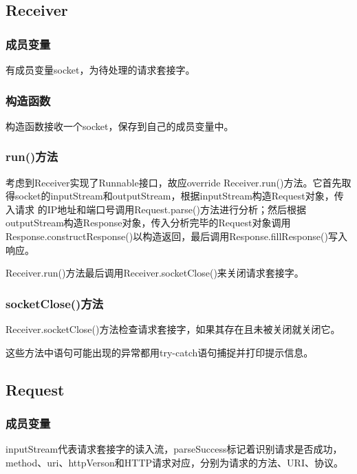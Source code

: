\documentclass[UTF8,12pt]{ctexart}
\begin{document}
\subsection{Receiver}

\subsubsection{成员变量}

有成员变量socket，为待处理的请求套接字。

\subsubsection{构造函数}

构造函数接收一个socket，保存到自己的成员变量中。

\subsubsection{run()方法}

考虑到Receiver实现了Runnable接口，故应override Receiver.run()方法。它首先取得socket的inputStream和outputStream，根据inputStream构造Request对象，传入请求 的IP地址和端口号调用Request.parse()方法进行分析；然后根据outputStream构造Response对象，传入分析完毕的Request对象调用Response.constructResponse()以构造返回，最后调用Response.fillResponse()写入响应。

Receiver.run()方法最后调用Receiver.socketClose()来关闭请求套接字。

\subsubsection{socketClose()方法}

Receiver.socketClose()方法检查请求套接字，如果其存在且未被关闭就关闭它。

\vspace*{2\baselineskip} 

这些方法中语句可能出现的异常都用try-catch语句捕捉并打印提示信息。

\subsection{Request}

\subsubsection{成员变量}

inputStream代表请求套接字的读入流，parseSuccess标记着识别请求是否成功，method、uri、httpVerson和HTTP请求对应，分别为请求的方法、URI、协议。
\end{document}
